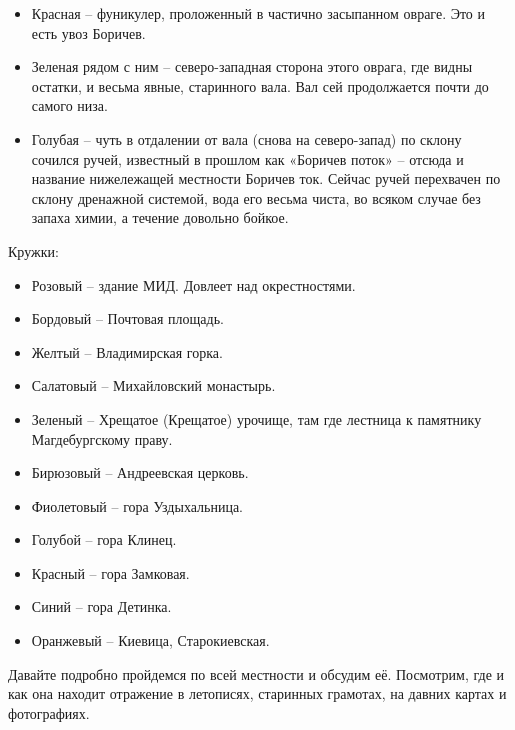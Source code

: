 \begin{itemize}
\item Красная – фуникулер, проложенный в частично засыпанном овраге. Это и есть увоз Боричев.

\item Зеленая рядом с ним – северо-западная сторона этого оврага, где видны остатки, и весьма явные, старинного вала. Вал сей продолжается почти до самого низа.

\item Голубая – чуть в отдалении от вала (снова на северо-запад) по склону сочился ручей, известный в прошлом как «Боричев поток» – отсюда и название нижележащей местности Боричев ток. Сейчас ручей перехвачен по склону дренажной системой, вода его весьма чиста, во всяком случае без запаха химии, а течение довольно бойкое.
\end{itemize}

Кружки:

\begin{itemize}
\item Розовый – здание МИД. Довлеет над окрестностями.

\item Бордовый – Почтовая площадь.

\item Желтый – Владимирская горка.

\item Салатовый – Михайловский монастырь.

\item Зеленый – Хрещатое (Крещатое) урочище, там где лестница к памятнику Магдебургскому праву.

\item Бирюзовый – Андреевская церковь.

\item Фиолетовый – гора Уздыхальница.

\item Голубой – гора Клинец.

\item Красный – гора Замковая.

\item Синий – гора Детинка.

\item Оранжевый – Киевица, Старокиевская.
\end{itemize}

Давайте подробно пройдемся по всей местности и обсудим её. Посмотрим, где и как она находит отражение в летописях, старинных грамотах, на давних картах и фотографиях. 


